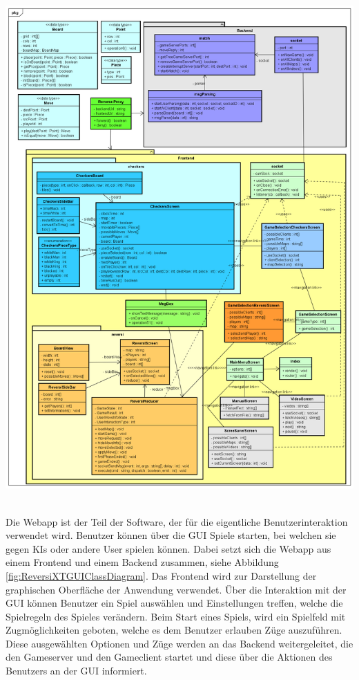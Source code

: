 \documentclass[12pt,a4paper,bibliography=totocnumbered,listof=totocnumbered]{article}
\begin{document}
\vspace{1em}
\begin{minipage}{\linewidth}
	\centering
	\includegraphics[width=0.9\linewidth]{pics/ReversiXTGUIClassDiagramm.png}
	\label{fig:ReversiXTGUIClassDiagram}
\end{minipage}
\\

Die Webapp ist der Teil der Software, der für die eigentliche Benutzerinteraktion verwendet wird. Benutzer können über die GUI
Spiele starten, bei welchen sie gegen KIs oder andere User spielen können. Dabei setzt sich die Webapp aus einem Frontend und 
einem Backend zusammen, siehe Abbildung \ref{fig:ReversiXTGUIClassDiagram}. 
Das Frontend wird zur Darstellung der graphischen Oberfläche der Anwendung verwendet. Über die Interaktion mit der 
\ac{GUI} können Benutzer ein Spiel auswählen und Einstellungen treffen, welche die Spielregeln des Spieles verändern.
Beim Start eines Spiels, wird ein Spielfeld mit Zugmöglichkeiten geboten, welche es dem Benutzer erlauben 
Züge auszuführen.
Diese ausgewählten Optionen und Züge werden an das Backend weitergeleitet, die den Gameserver und den Gameclient 
startet und diese über die Aktionen des Benutzers an der \ac{GUI} informiert. 
\end{document}
